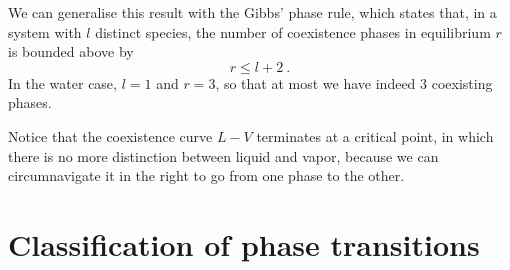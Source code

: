     We can generalise this result with the Gibbs' phase rule, which states that, in a system with $l$ distinct species, the number of coexistence phases in equilibrium $r$ is bounded above by 
    \begin{equation*}
        r \leq l + 2 ~.
    \end{equation*} 
    In the water case, $l = 1$ and $r = 3$, so that at most we have indeed $3$ coexisting phases.

    Notice that the coexistence curve $L-V$ terminates at a critical point, in which there is no more distinction between liquid and vapor, because we can circumnavigate it in the right to go from one phase to the other.

\section{Classification of phase transitions}

